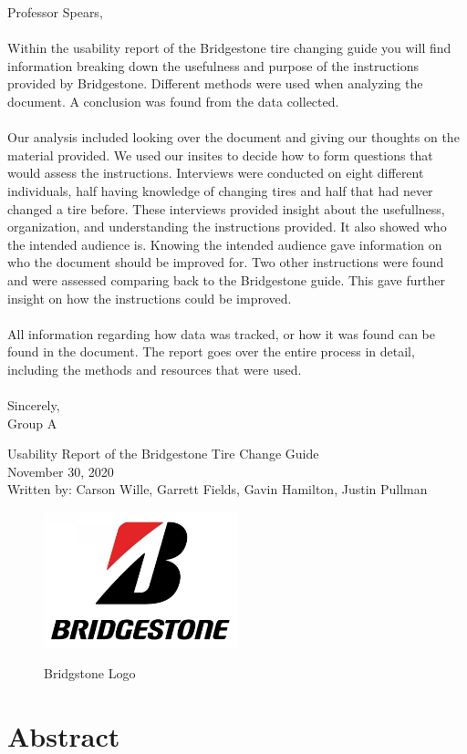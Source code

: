 \documentclass[12pt,A4paper]{article}
\begin{document}
	\noindent
	Professor Spears, \\ \\
	\noindent
	Within the usability report of the Bridgestone tire changing guide you will find information breaking down the usefulness and purpose of the instructions provided by Bridgestone. Different methods were used when analyzing the document. A conclusion was found from the data collected.\\ 
	\\Our analysis included looking over the document and giving our thoughts on the material provided. We used our insites to decide how to form questions that would assess the instructions. Interviews were conducted on eight different individuals, half having knowledge of changing tires and half that had never changed a tire before. These interviews provided insight about the usefullness, organization, and understanding the instructions provided. It also showed who the intended audience is. Knowing the intended audience gave information on who the document should be improved for. Two other instructions were found and were assessed comparing back to the Bridgestone guide. This gave further insight on how the instructions could be improved.\\ 
	\\All information regarding how data was tracked, or how it was found can be found in the document. The report goes over the entire process in detail, including the methods and resources that were used.\\ \\Sincerely,\\ Group A
	\thispagestyle{empty}
	\clearpage
	\thispagestyle{empty}
	\begin{center}
		\Huge
		Usability Report of the Bridgestone Tire Change Guide \\
		\vspace{0.25 in}
		\Large
		 November 30, 2020 \\
		 \vspace{0.25 in}
		Written by: Carson Wille, Garrett Fields, Gavin Hamilton, Justin Pullman
		\begin{figure}[!h]
			\centering
			\vspace{0.5 in}
			\includegraphics[width=0.5\textwidth]{logo.jpg}
			\label{fig:f1}
			\caption{Bridgstone Logo}
		\end{figure}
		\vspace*{\fill}
		\section{Abstract}
	\end{center}
\end{document}
